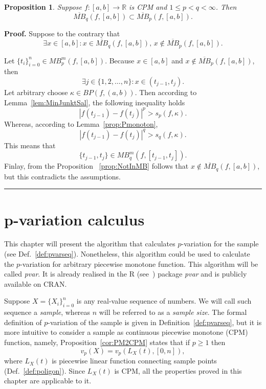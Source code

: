 \documentclass[12pt, a4paper]{article}
\newtheorem{proposition}[theorem]{Proposition}
\newenvironment{proof}[1][Proof]{\noindent \textbf{#1.} }{\  \rule{0.5em}{0.5em}}
\numberwithin{equation}{section}
\begin{document}
\begin{proposition}\label{prop:MBMonoton} 
  Suppose $f:[a,b] \rightarrow \mathbb{R}$ is CPM and 
  $1 \leq p < q < \infty$. Then
  $$\overline{MB}_{q}(f,[a,b]) \subset \overline{MB}_{p}(f,[a,b]). $$
\end{proposition}
\begin{proof}
  Suppose to the contrary that
  \begin{equation*}
  \exists x \in[a,b]:x \in \overline{MB}_{q}(f,[a,b]),\,x \notin \overline{MB}_{p}(f,[a,b]).   
  \end{equation*}

  Let $\{t_i\}_{i=0}^n \in MB_p^m(f,[a,b])$. 
  Because $x \in [a,b]$ and $x \notin \overline{MB}_{p}(f,[a,b])$, then
  \begin{equation}\label{eq:xinj}
    \exists j \in\{1,2,\dots,n\}:x\in (t_{j-1},t_j). 
  \end{equation}
  Let arbitrary choose $\kappa \in BP(f,(a,b))$.
  Then according to Lemma~\ref{lem:MinJunktSal}, the following inequality holds
  \begin{equation*}
    |f(t_{j-1})-f(t_{j})|^p > s_p(f, \kappa).
  \end{equation*}
  Whereas, according to Lemma~\ref{prop:Pmonoton},
  \begin{equation*}
    |f(t_{j-1})-f(t_{j})|^q > s_q(f, \kappa).
  \end{equation*} 
  This means that
  $$\{t_{j-1}, t_j \} \in MB_q^m(f,[t_{j-1},t_j]).$$ 
  Finlay, from the Proposition~ \ref{prop:NotInMB} follows that $x \notin \overline{MB}_q(f,[a,b])$,
  but this contradicts the assumptions.
\end{proof}
  
\section{p-variation calculus}  
  
This chapter will present the algorithm that calculates 
$p$-variation for the sample 
(see Def.~\ref{def:pvarseq}).
Nonetheless, this algorithm could be used to calculate
the $p$-variation for arbitrary piecewise monotone function. 
This algorithm will be called \emph{pvar}. 
It is already realised in the R (see~\cite{R}) package \emph{pvar} and
is publicly available on CRAN\footnotemark.

Suppose $X=\{X_{i}\}_{i=0}^{n}$ is any real-value sequence of numbers. 
We will call such sequence a \emph{sample}, 
whereas $n$ will be referred to as a \emph{sample size}.
The formal definition of $p$-variation 
of the sample is given in Definition~\ref{def:pvarseq}, but 
it is more intuitive to consider a sample as 
continuous piecewise monotone (CPM) function, namely,
Proposition~\ref{cor:PM2CPM} states that if $p\geq1$ then
\begin{equation}
  v_p(X) = v_p(L_X(t),[0,n]),
\end{equation}
where $L_X(t)$ is piecewise linear function 
connecting sample points (Def.~\ref{def:poligon}).
Since $L_X(t)$ is CPM, all the properties proved in this chapter are
applicable to it.
\end{document}
